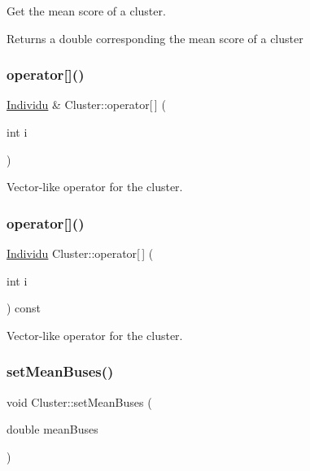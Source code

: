 Get the mean score of a cluster. 

\begin{DoxyReturn}{Returns}
a double corresponding the mean score of a cluster 
\end{DoxyReturn}
\mbox{\label{class_cluster_a9460341680f84e640ad6744d97088948}} 
\subsubsection{\texorpdfstring{operator[]()}{operator[]()}\hspace{0.1cm}{\footnotesize\ttfamily [1/2]}}
{\footnotesize\ttfamily \hyperlink{class_individu}{Individu} \& Cluster\+::operator\mbox{[}$\,$\mbox{]} (\begin{DoxyParamCaption}\item[{int}]{i }\end{DoxyParamCaption})}



Vector-\/like operator for the cluster. 

\mbox{\label{class_cluster_a18e8355ff8f934e5e3deb10c1b7ec0f6}} 
\subsubsection{\texorpdfstring{operator[]()}{operator[]()}\hspace{0.1cm}{\footnotesize\ttfamily [2/2]}}
{\footnotesize\ttfamily \hyperlink{class_individu}{Individu} Cluster\+::operator\mbox{[}$\,$\mbox{]} (\begin{DoxyParamCaption}\item[{int}]{i }\end{DoxyParamCaption}) const}



Vector-\/like operator for the cluster. 

\mbox{\label{class_cluster_a78748b29ae0d126a6228fb1e25128653}} 
\subsubsection{\texorpdfstring{set\+Mean\+Buses()}{setMeanBuses()}}
{\footnotesize\ttfamily void Cluster\+::set\+Mean\+Buses (\begin{DoxyParamCaption}\item[{double}]{mean\+Buses }\end{DoxyParamCaption})}



